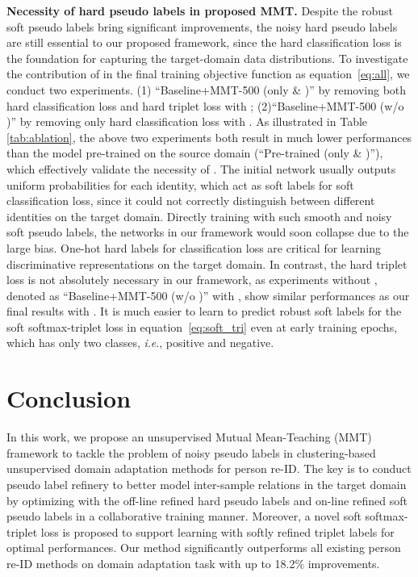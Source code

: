 \documentclass{article} \usepackage{iclr2020_conference,times}
\def\eqref#1{equation~\ref{#1}}
\newcommand{\ie}{\textit{i}.\textit{e}., }
\begin{document}
\noindent\textbf{Necessity of hard pseudo labels in proposed MMT.}
Despite the robust soft pseudo labels bring significant improvements,
the noisy hard pseudo labels are still essential to our proposed framework,
since the hard classification loss  is the foundation for capturing the target-domain data distributions.
To investigate the contribution of  in the final training objective function as \eqref{eq:all},
we conduct two experiments. (1) ``Baseline+MMT-500 (only  \& )'' by removing both hard classification loss and hard triplet loss with ; (2)``Baseline+MMT-500 (w/o )'' by removing only hard classification loss with .
As illustrated in Table \ref{tab:ablation},
the above two experiments both result in much lower performances than the model pre-trained on the source domain (``Pre-trained (only  \& )''), which effectively validate the necessity of .
The initial network usually outputs uniform probabilities for each identity, which act as soft labels for soft classification loss, since it could not correctly distinguish between different identities on the target domain.
Directly training with such smooth and noisy soft pseudo labels, the networks in our framework would soon collapse due to the large bias.
One-hot hard labels for classification loss are critical for learning discriminative representations on the target domain.
In contrast, 
the hard triplet loss  is not absolutely necessary in our framework,
as experiments without , denoted as ``Baseline+MMT-500 (w/o )'' with , show similar performances as our final results with .
It is much easier to learn to predict robust soft labels for the soft softmax-triplet loss in \eqref{eq:soft_tri}  even at early training epochs,
which has only two classes, \ie positive and negative.






\section{Conclusion}
\vspace{-5pt}
In this work, we propose an unsupervised Mutual Mean-Teaching (MMT) framework to tackle the problem of noisy pseudo labels in clustering-based unsupervised domain adaptation methods for person re-ID.
The key is to conduct pseudo label refinery to better model inter-sample relations in the target domain by optimizing with the off-line refined hard pseudo labels and on-line refined soft pseudo labels in a collaborative training manner.
Moreover, a novel soft softmax-triplet loss is proposed to support learning with softly refined triplet labels for optimal performances.
Our method significantly outperforms all existing person re-ID methods on domain adaptation task with up to 18.2\% improvements.
\end{document}
